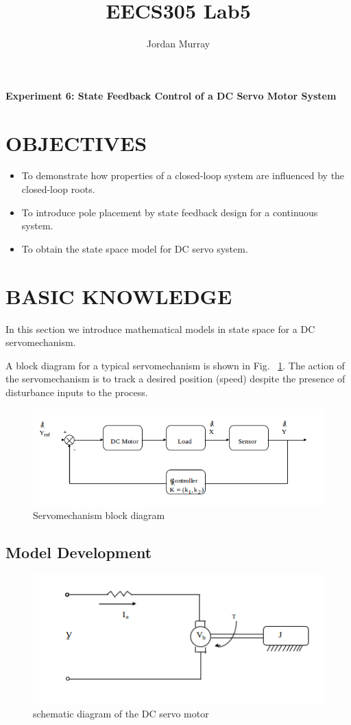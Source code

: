 \documentclass[11pt,a4paper]{article}
\author{Jordan Murray}
\title{EECS305 Lab5}
\begin{document}
\begin{center}
\fontsize{24}{12}\selectfont
\textbf{Experiment 6: State Feedback Control of a DC Servo Motor System}
\end{center}

\section{OBJECTIVES}
\begin{itemize}
\item To demonstrate how properties of a closed-loop system are influenced by the closed-loop roots.
\item To introduce pole placement by state feedback design for a continuous system.
\item To obtain the state space model for DC servo system.
\end{itemize}

\section{BASIC KNOWLEDGE}
In this section we introduce mathematical models in state space for a DC servomechanism.

A block diagram for a typical servomechanism is shown in Fig. ~\ref{fig:servostatespaceblock}. The action of the servomechanism is to track a desired position (speed) despite the presence of disturbance inputs to the process.

\begin{figure}[here]
\includegraphics[width=\textwidth]{imglab/servostatespaceblock.png}
\caption{Servomechanism block diagram}
\label{fig:servostatespaceblock}
\end{figure}

\subsection{Model Development}

\begin{figure}[here]
\includegraphics[width=\textwidth]{imglab/servoschemdiagram.png}
\caption{schematic diagram of the DC servo motor}
\label{fig:servoschem}
\end{figure}
\end{document}
